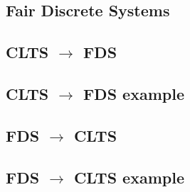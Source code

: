 \documentclass{article}
\begin{document}
%

\subsection{Fair Discrete Systems}


%

%

%

\subsection{CLTS $\rightarrow$ FDS}

\subsection{CLTS $\rightarrow$ FDS example}

%

\subsection{FDS $\rightarrow$ CLTS}


\subsection{FDS $\rightarrow$ CLTS example}

\end{document}
